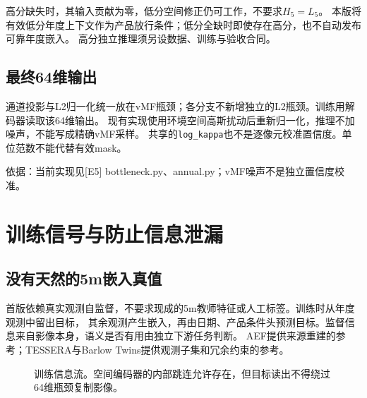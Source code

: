 \documentclass[UTF8,fontset=fandol,zihao=5,a4paper]{ctexart}
\newcommand{\source}[1]{\par{\footnotesize\color{muted}依据：#1}\par}
\newcommand{\reportpage}{\clearpage}
\begin{document}
高分缺失时，其输入贡献为零，低分空间修正仍可工作，不要求$H_5=L_5$。
本版将有效低分年度上下文作为产品放行条件；低分全缺时即使存在高分，也不自动发布可靠年度嵌入。
高分独立推理须另设数据、训练与验收合同。

\subsection{最终64维输出}
通道投影与L2归一化统一放在vMF瓶颈；各分支不新增独立的L2瓶颈。训练用解码器读取该64维输出。
现有实现使用环境空间高斯扰动后重新归一化，推理不加噪声，不能写成精确vMF采样。
共享的\texttt{log\_kappa}也不是逐像元校准置信度。单位范数不能代替有效mask\cite{vmf}。
\source{当前实现见[E5] bottleneck.py、annual.py；vMF噪声不是独立置信度校准。}

\reportpage
\section{训练信号与防止信息泄漏}
\subsection{没有天然的5m嵌入真值}
首版依赖真实观测自监督，不要求现成的5m教师特征或人工标签。训练时从年度观测中留出目标，
其余观测产生嵌入，再由日期、产品条件头预测目标。监督信息来自影像本身，语义是否有用由独立下游任务判断。
AEF提供来源重建的参考；TESSERA与Barlow Twins提供观测子集和冗余约束的参考\cite{aef,tessera,barlow}。

\begin{figure}[h]
\centering
{}
\caption{训练信息流。空间编码器的内部跳连允许存在，但目标读出不得绕过64维瓶颈复制影像。}
\end{figure}
\end{document}
